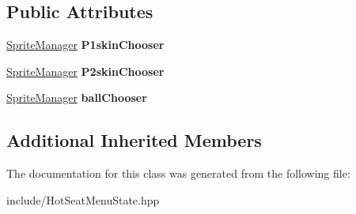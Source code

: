 \subsection*{Public Attributes}
\begin{DoxyCompactItemize}
\item 
\mbox{\label{class_hot_seat_menu_state_afe57c9d8f34baf40c000723a7593db48}} 
\mbox{\hyperlink{class_sprite_manager}{Sprite\+Manager}} {\bfseries P1skin\+Chooser}
\item 
\mbox{\label{class_hot_seat_menu_state_a9ffea759e40ba0bc41c2a3afd72b783e}} 
\mbox{\hyperlink{class_sprite_manager}{Sprite\+Manager}} {\bfseries P2skin\+Chooser}
\item 
\mbox{\label{class_hot_seat_menu_state_a5bb9a6757abc66a4b40329feb31c136b}} 
\mbox{\hyperlink{class_sprite_manager}{Sprite\+Manager}} {\bfseries ball\+Chooser}
\end{DoxyCompactItemize}
\subsection*{Additional Inherited Members}


The documentation for this class was generated from the following file\+:\begin{DoxyCompactItemize}
\item 
include/Hot\+Seat\+Menu\+State.\+hpp\end{DoxyCompactItemize}
